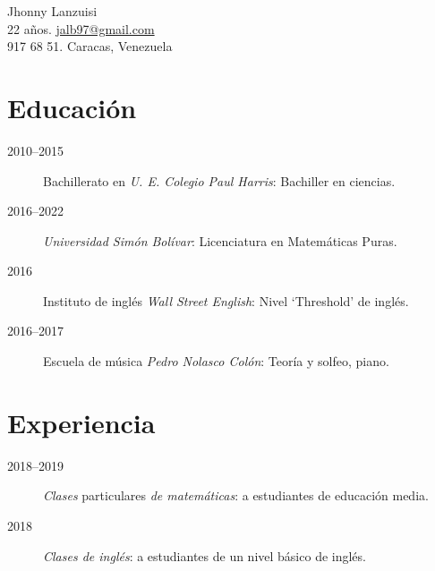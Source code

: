 \documentclass[draft,letterpaper,10pt]{article}
\newcommand{\entryone}[2]{
{\noindent\textsc{#1}}
\begin{quotation}
	\noindent#2.
\end{quotation}
}
\let\oldtextsc=\textsc
\renewcommand{\textsc}[1]{\oldtextsc{\MakeLowercase{#1}}}
\newcommand{\enraya}{–}
\begin{document}
\begin{center}\LARGE
	\dispfont Jhonny Lanzuisi \\ \medskip\large
	22 años. \url{jalb97@gmail.com} \\  917 68 51. Caracas, Venezuela 
\end{center}
\medskip

\section*{Educación}
\begin{description}
	\item[2010\enraya2015]Bachillerato en \emph{U. E. Colegio Paul Harris}: Bachiller en ciencias.
	\item[2016\enraya2022\enspace ] \emph{Universidad Simón Bolívar}: Licenciatura en Matemáticas Puras.
	\item[2016] Instituto de inglés \emph{Wall Street English}: Nivel `Threshold' de inglés.
	\item[2016\enraya2017] Escuela de música \emph{Pedro Nolasco Colón}: Teoría y solfeo, piano.
\end{description}

\section*{Experiencia}
\begin{description}
	\item[2018\enraya2019] \emph{Clases} particulares \emph{de matemáticas}: a estudiantes de educación media.
	\item[2018] \emph{Clases de inglés}: a estudiantes de un nivel básico de inglés.
\end{description}
\end{document}
